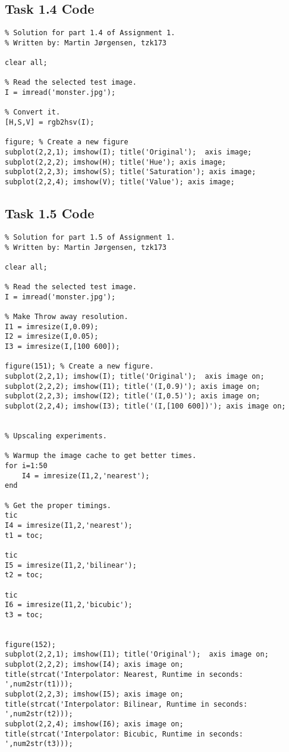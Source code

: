 \subsection{Task 1.4 Code}
\begin{verbatim}
% Solution for part 1.4 of Assignment 1.
% Written by: Martin Jørgensen, tzk173

clear all;

% Read the selected test image.
I = imread('monster.jpg');

% Convert it.
[H,S,V] = rgb2hsv(I);

figure; % Create a new figure
subplot(2,2,1); imshow(I); title('Original');  axis image;
subplot(2,2,2); imshow(H); title('Hue'); axis image;
subplot(2,2,3); imshow(S); title('Saturation'); axis image;
subplot(2,2,4); imshow(V); title('Value'); axis image;
\end{verbatim}

\subsection{Task 1.5 Code}
\begin{verbatim}
% Solution for part 1.5 of Assignment 1.
% Written by: Martin Jørgensen, tzk173

clear all;

% Read the selected test image.
I = imread('monster.jpg');

% Make Throw away resolution.
I1 = imresize(I,0.09);
I2 = imresize(I,0.05);
I3 = imresize(I,[100 600]);

figure(151); % Create a new figure.
subplot(2,2,1); imshow(I); title('Original');  axis image on;
subplot(2,2,2); imshow(I1); title('(I,0.9)'); axis image on;
subplot(2,2,3); imshow(I2); title('(I,0.5)'); axis image on;
subplot(2,2,4); imshow(I3); title('(I,[100 600])'); axis image on;


% Upscaling experiments.

% Warmup the image cache to get better times.
for i=1:50
    I4 = imresize(I1,2,'nearest');
end

% Get the proper timings.
tic
I4 = imresize(I1,2,'nearest');
t1 = toc;

tic
I5 = imresize(I1,2,'bilinear');
t2 = toc;

tic
I6 = imresize(I1,2,'bicubic');
t3 = toc;


figure(152);
subplot(2,2,1); imshow(I1); title('Original');  axis image on;
subplot(2,2,2); imshow(I4); axis image on;
title(strcat('Interpolator: Nearest, Runtime in seconds: ',num2str(t1)));
subplot(2,2,3); imshow(I5); axis image on;
title(strcat('Interpolator: Bilinear, Runtime in seconds: ',num2str(t2)));
subplot(2,2,4); imshow(I6); axis image on;
title(strcat('Interpolator: Bicubic, Runtime in seconds: ',num2str(t3)));
\end{verbatim}


